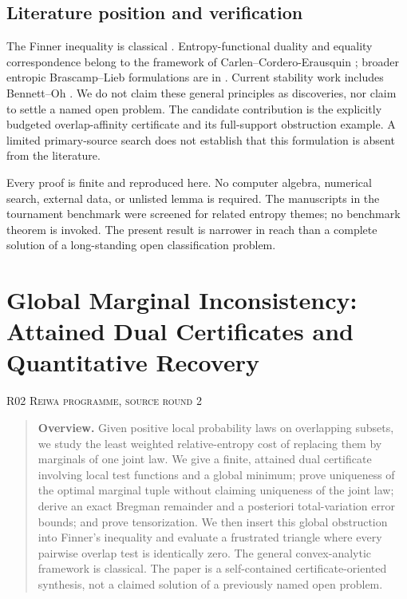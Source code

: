 \documentclass[11pt,a4paper]{article}
\theoremstyle{definition}\newtheorem{definition}[theorem]{Definition}
\theoremstyle{remark}\newtheorem{remark}[theorem]{Remark}
\numberwithin{equation}{section}
\begin{document}
\subsection{Literature position and verification}\label{R01-sec-5}
The Finner inequality is classical \cite{ref059}. Entropy-functional duality and equality correspondence belong to the framework of Carlen--Cordero-Erausquin \cite{ref060}; broader entropic Brascamp--Lieb formulations are in \cite{ref061}. Current stability work includes Bennett--Oh \cite{ref062}. We do not claim these general principles as discoveries, nor claim to settle a named open problem. The candidate contribution is the explicitly budgeted overlap-affinity certificate and its full-support obstruction example. A limited primary-source search does not establish that this formulation is absent from the literature.

Every proof is finite and reproduced here. No computer algebra, numerical search, external data, or unlisted lemma is required. The manuscripts in the tournament benchmark were screened for related entropy themes; no benchmark theorem is invoked. The present result is narrower in reach than a complete solution of a long-standing open classification problem.




\clearpage
\section[R02 --- Global Marginal Inconsistency: Attained Dual Certificates and Quantitative Recovery]{Global Marginal Inconsistency: Attained Dual Certificates and Quantitative Recovery}\label{contrib-R02}
\noindent\textsc{R02 \quad Reiwa programme, source round 2}\par\medskip


\begin{quote}\small\textbf{Overview.} Given positive local probability laws on overlapping subsets, we study the least weighted relative-entropy cost of replacing them by marginals of one joint law. We give a finite, attained dual certificate involving local test functions and a global minimum; prove uniqueness of the optimal marginal tuple without claiming uniqueness of the joint law; derive an exact Bregman remainder and a posteriori total-variation error bounds; and prove tensorization. We then insert this global obstruction into Finner's inequality and evaluate a frustrated triangle where every pairwise overlap test is identically zero. The general convex-analytic framework is classical. The paper is a self-contained certificate-oriented synthesis, not a claimed solution of a previously named open problem.\end{quote}
\end{document}
